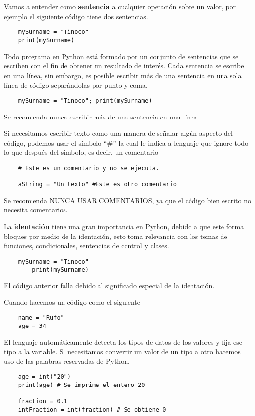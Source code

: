 \documentclass[12pt]{article}
\theoremstyle{definition}
\begin{document}
    Vamos a entender como \textbf{sentencia} a cualquier operación sobre un valor, por ejemplo el siguiente código tiene dos sentencias.
    \begin{lstlisting}
    mySurname = "Tinoco"
    print(mySurname)
    \end{lstlisting}

    Todo programa en Python está formado por un conjunto de sentencias que se escriben con el fin de obtener un resultado de interés.
    Cada sentencia se escribe en una línea, sin embargo, es posible escribir más de una sentencia en una sola línea de
    código separándolas por punto y coma.
    \begin{lstlisting}
    mySurname = "Tinoco"; print(mySurname)
    \end{lstlisting}
    Se recomienda nunca escribir más de una sentencia en una línea.

    Si necesitamos escribir texto como una manera de señalar algún aspecto del código, podemos usar el símbolo ``$\#$''
    la cual le indica a lenguaje que ignore todo lo que después del símbolo, es decir, un comentario.

    \begin{lstlisting}
    # Este es un comentario y no se ejecuta.

    aString = "Un texto" #Este es otro comentario
    \end{lstlisting}
    Se recomienda NUNCA USAR COMENTARIOS, ya que el código bien escrito no necesita comentarios.

    La \textbf{identación} tiene una gran importancia en Python, debido a que este forma bloques por
    medio de la identación, esto toma relevancia con los temas de funciones, condicionales, sentencias de control y clases.

    \begin{lstlisting}
    mySurname = "Tinoco"
        print(mySurname)
    \end{lstlisting}

    El código anterior falla debido al significado especial de la identación.

    Cuando hacemos un código como el siguiente
    \begin{lstlisting}
    name = "Rufo"
    age = 34
    \end{lstlisting}

    El lenguaje automáticamente detecta los tipos de datos de los valores y fija ese tipo a la variable.
    Si necesitamos convertir un valor de un tipo a otro hacemos uso de las palabras reservadas de Python.
    \begin{lstlisting}
    age = int("20")
    print(age) # Se imprime el entero 20

    fraction = 0.1
    intFraction = int(fraction) # Se obtiene 0
    \end{lstlisting}
\end{document}
